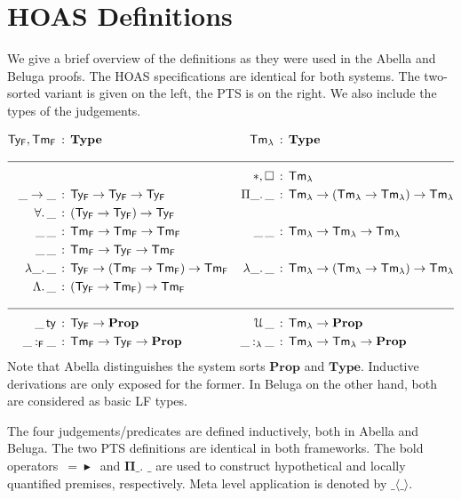 \documentclass[a4paper,UKenglish]{lipics-v2016}
\newcommand{\ms}{\,}
\newcommand{\mrel}[1]{\mathrel{\ms #1 \ms}}
\newcommand{\Prop}{\ensuremath{\mathbf{Prop}}}
\newcommand{\Type}{\ensuremath{\mathbf{Type}}}
\newcommand{\OF}{\mrel{:}}
\newcommand{\TyF}{\ensuremath{\mathsf{Ty_{F}}}}
\newcommand{\TmF}{\ensuremath{\mathsf{Tm_{F}}}}
\newcommand{\TmL}{\ensuremath{\mathsf{Tm_{\lambda}}}}
\newcommand{\istyFh}[1]{\ensuremath{#1\ms\mathsf{ty}}}
\newcommand{\typingFh}[2]{\ensuremath{#1 \mathbin{:_{\mathsf{F}}} #2}}
\newcommand{\sortLh}[1]{\ensuremath{\mathcal{U}\ms#1}}
\newcommand{\typingLh}[2]{\ensuremath{#1 \mathbin{:_{\lambda}} #2}}
\newcommand{\lpPi}[1]{\mathbf{\Pi} #1.\ms\ms}
\newcommand{\lpApp}[2]{#1\langle#2\rangle}
\newcommand{\lpImp}{\mrel{=\!\blacktriangleright}}
\newcommand{\Prp}{\ensuremath{\textrm{\textasteriskcentered}}}
\newcommand{\Typ}{\ensuremath{\square}}
\newcommand{\All}{\ensuremath{\forall.\,}}
\newcommand{\Lam}[1]{\ensuremath{\lambda #1.\,}}
\newcommand{\TyLam}{\ensuremath{\Lambda.\,}}
\newcommand{\Prod}[1]{\ensuremath{\Pi #1.\,}}
\theoremstyle{plain}
\begin{document}
\section{HOAS Definitions}
\label{apdx:hoas}

We give a brief overview of the definitions as they were used in the Abella and Beluga proofs.
The HOAS specifications are identical for both systems.
The two-sorted variant is given on the left, the PTS is on the right.
We also include the types of the judgements.

\newcommand{\ET}{\ensuremath{\_}}
\begin{align*}
  \TyF, \TmF &\OF \Type & \TmL &\OF \Type\\
  \cline{1-4}
  & & \Prp, \Typ &\OF \TmL \\
  \ET \to \ET &\OF \TyF \to \TyF \to \TyF & \Prod \ET \ET &\OF \TmL \to (\TmL \to \TmL) \to \TmL\\
  \All \ET &\OF (\TyF \to \TyF) \to \TyF & &\\
  \ET\,\ET &\OF \TmF \to \TmF \to \TmF & \ET\,\ET &\OF \TmL \to \TmL \to \TmL\\
  \ET\,\ET &\OF \TmF \to \TyF \to \TmF & &\\
  \Lam \ET \ET &\OF \TyF \to (\TmF \to \TmF) \to \TmF & \Lam \ET \ET &\OF \TmL \to (\TmL \to \TmL) \to \TmL\\
  \TyLam \ET &\OF (\TyF \to \TmF) \to \TmF & &\\
  \cline{1-4}
  \istyFh \ET &\OF \TyF \to \Prop & \sortLh \ET &\OF \TmL \to \Prop\\
  \typingFh \ET \ET &\OF \TmF \to \TyF \to \Prop & \typingLh \ET \ET &\OF \TmL \to \TmL \to \Prop
\end{align*}
Note that Abella distinguishes the system sorts $\Prop$ and $\Type$.
Inductive derivations are only exposed for the former.
In Beluga on the other hand, both are considered as basic LF types.

The four judgements/predicates are defined inductively, both in Abella and Beluga.
The two PTS definitions are identical in both frameworks.
The bold operators $\lpImp$ and $\lpPi \ET \ET$  are used to construct hypothetical and locally quantified premises, respectively.
Meta level application is denoted by $\lpApp \ET \ET$.
\end{document}
